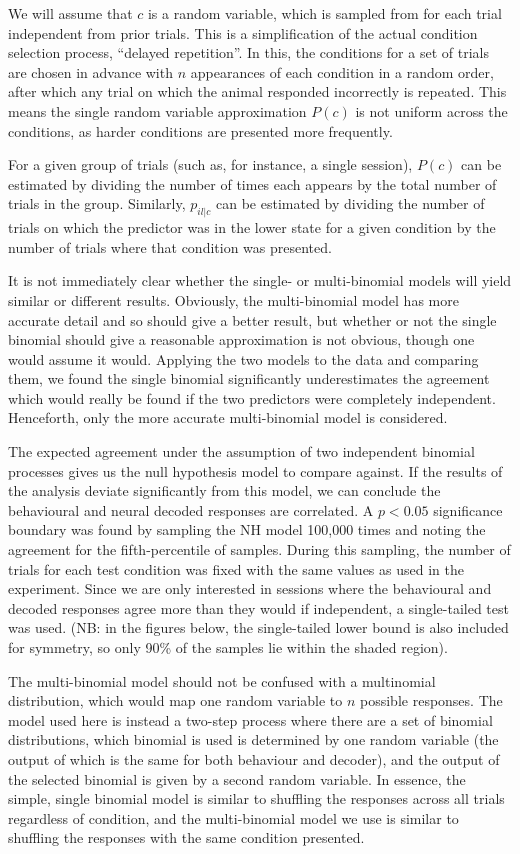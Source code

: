 We will assume that $c$ is a random variable, which is sampled from for each trial independent from prior trials.
This is a simplification of the actual condition selection process, ``delayed repetition''.
In this, the conditions for a set of trials are chosen in advance with $n$ appearances of each condition in a random order, after which any trial on which the animal responded incorrectly is repeated.
This means the single random variable approximation $P(c)$ is not uniform across the conditions, as harder conditions are presented more frequently.

For a given group of trials (such as, for instance, a single session), $P(c)$ can be estimated by dividing the number of times each appears by the total number of trials in the group.
Similarly, $p_{il|c}$ can be estimated by dividing the number of trials on which the predictor was in the lower state for a given condition by the number of trials where that condition was presented.

It is not immediately clear whether the single- or multi-binomial models will yield similar or different results.
Obviously, the multi-binomial model has more accurate detail and so should give a better result, but whether or not the single binomial should give a reasonable approximation is not obvious, though one would assume it would.
Applying the two models to the data and comparing them, we found the single binomial significantly underestimates the agreement which would really be found if the two predictors were completely independent.
Henceforth, only the more accurate multi-binomial model is considered.

The expected agreement under the assumption of two independent binomial processes gives us the null hypothesis model to compare against.
If the results of the analysis deviate significantly from this model, we can conclude the behavioural and neural decoded responses are correlated.
A $p<0.05$ significance boundary was found by sampling the NH model 100,000 times and noting the agreement for the fifth-percentile of samples.
During this sampling, the number of trials for each test condition was fixed with the same values as used in the experiment.
Since we are only interested in sessions where the behavioural and decoded responses agree more than they would if independent, a single-tailed test was used.
(NB: in the figures below, the single-tailed lower bound is also included for symmetry, so only 90\% of the samples lie within the shaded region).

The multi-binomial model should not be confused with a multinomial distribution, which would map one random variable to $n$ possible responses.
The model used here is instead a two-step process where there are a set of binomial distributions, which binomial is used is determined by one random variable (the output of which is the same for both behaviour and decoder), and the output of the selected binomial is given by a second random variable.
In essence, the simple, single binomial model is similar to shuffling the responses across all trials regardless of condition, and the multi-binomial model we use is similar to shuffling the responses with the same condition presented.

